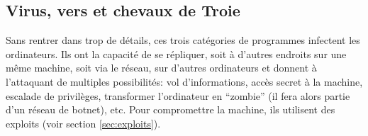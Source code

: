 \documentclass[article, french]{yReport}
\begin{document}
	\subsection{Virus, vers et chevaux de Troie}
	Sans rentrer dans trop de détails, ces trois catégories de programmes infectent les ordinateurs. Ils ont la capacité de se répliquer, soit à d'autres endroits sur une même machine, soit via le réseau, sur d'autres ordinateurs et donnent à l'attaquant de multiples possibilités: vol d'informations, accès secret à la machine, escalade de privilèges, transformer l'ordinateur en \enquote{zombie} (il fera alors partie d'un réseau de botnet), etc. Pour compromettre la machine, ils utilisent des exploits (voir section \ref{sec:exploits}).
	
	\newpage
\end{document}
